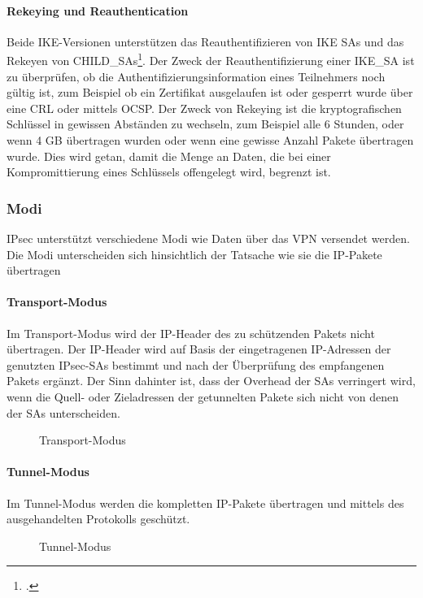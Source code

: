 \paragraph{Rekeying und Reauthentication}
Beide IKE-Versionen unterstützen das Reauthentifizieren von IKE SAs und das Rekeyen
von CHILD\_SAs\footcite[][616]{charlie_kaufman_rfc_2014}.
Der Zweck der Reauthentifizierung einer IKE\_SA ist zu überprüfen, ob die Authentifizierungsinformation
eines Teilnehmers noch gültig ist, zum Beispiel ob ein Zertifikat ausgelaufen ist oder gesperrt
wurde über eine \ac{CRL} oder mittels \ac{OCSP}.
Der Zweck von Rekeying ist die kryptografischen Schlüssel in gewissen Abständen zu wechseln,
zum Beispiel alle 6 Stunden, oder wenn 4 GB übertragen wurden oder wenn eine gewisse Anzahl
Pakete übertragen wurde. Dies wird getan, damit die Menge an Daten, die bei einer Kompromittierung
eines Schlüssels offengelegt wird, begrenzt ist.


\subsubsection{Modi}
\ac{IPsec} unterstützt verschiedene Modi wie Daten über das VPN versendet werden.
Die Modi unterscheiden sich hinsichtlich der Tatsache wie sie die \ac{IP}-Pakete übertragen
\paragraph{Transport-Modus}
Im Transport-Modus wird der \ac{IP}-Header des zu schützenden Pakets nicht übertragen.
Der IP-Header wird auf Basis der eingetragenen IP-Adressen der genutzten \ac{IPsec}-\acp{SA}
bestimmt und nach der Überprüfung des empfangenen Pakets ergänzt. Der Sinn dahinter ist, dass
der Overhead der \acp{SA} verringert wird, wenn die Quell- oder Zieladressen der getunnelten Pakete
sich nicht von denen der \acp{SA} unterscheiden.
\begin{figure}[h!]
    \caption{Transport-Modus}
    \label{fig:Transport-Modus}
    \centering
    \def\svgwidth{\columnwidth}
    
\end{figure}

\paragraph{Tunnel-Modus}
Im Tunnel-Modus werden die kompletten \ac{IP}-Pakete übertragen und mittels des ausgehandelten
Protokolls geschützt.

\begin{figure}[h!]
    \caption{Tunnel-Modus}
    \label{fig:Tunnel-Modus}
    \centering
    \def\svgwidth{\columnwidth}
    
\end{figure}

